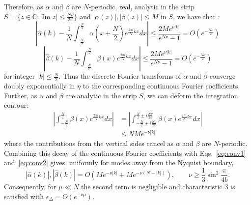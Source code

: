 \documentclass[aps,floatfix,10pt,amssymb,amsfont,amsmath,superscriptaddress,float,nofootinbib,longbibliography,nobalancelastpage,twocolumn]{revtex4-2}
\begin{document}
Therefore, as $\alpha$ and $\beta$ are $N$-periodic, real, analytic in the strip $S =\{z \in \mathbb{C}: |\text{Im } z| \leq \frac{N\nu}{2\pi}\}$ and $|\alpha(z)|, |\beta(z)| \leq M$ in $S$, we have that \cite{trefethen2014exponentially}:
\begin{equation}
\label{eq:conv1}
    \left|\hat\alpha(k) - \frac{1}{N}\int_{-\frac{N}{2}}^{\frac{N}{2}}\alpha(x+\frac{N}{2})e^{\frac{2\pi i}{N}kx} dx\right| \leq \frac{2 Me^{\nu |k|}}{e^{N\nu}-1} = O(e^{-\frac{N\nu}{2}})
\end{equation}
\begin{equation}
\label{eq:conv2}
    \left|\hat\beta(k) - \frac{1}{N}\int_{-\frac{N}{2}}^{\frac{N}{2}}\beta(x)e^{\frac{2\pi i}{N}kx} dx\right| \leq  \frac{2 Me^{\nu |k|}}{e^{N\nu}-1} = O(e^{-\frac{N\nu}{2}})
\end{equation}
for integer $|k| \leq \frac{N}{2}$. Thus the discrete Fourier transforms of $\alpha$ and $\beta$ converge doubly exponentially in $\eta$ to the corresponding continuous Fourier coefficients. Further, as $\alpha$ and $\beta$ are analytic in the strip $S$, we can deform the integration contour:
\begin{align}
    \left|\int_{-\frac{N}{2}}^{\frac{N}{2}}\beta(x)e^{\frac{2\pi i}{N}kx} dx\right| &=\left| \int_{-\frac{N}{2}\pm i\frac{N\nu}{2\pi}}^{\frac{N}{2}\pm i\frac{N\nu}{2\pi}}\beta(x)e^{\frac{2\pi i}{N}kx} dx\right|\\
    &\leq NMe^{-\nu|k|}
    \label{eq:tails}
\end{align}
where the contributions from the vertical sides cancel as $\alpha$ and $\beta$ are $N$-periodic. Combining this decay of the continuous Fourier coefficients with Eqs.~\eqref{eq:conv1} and~\eqref{eq:conv2} gives, uniformly for modes away from the Nyquist boundary,
\begin{equation}
\label{eq:exactdecay}
    |\hat \alpha(k)|, |\hat \beta(k)| = O\!\left(M e^{-\nu|k|}
    +M e^{-\nu(N-|k|)}\right),
    \qquad \nu\geq\frac13\sin^2\frac{\pi}{4b}.
\end{equation}
Consequently, for $\mu\ll N$ the second term is negligible and characteristic 3 is satisfied with $\epsilon_{\Delta}=O(e^{-\nu\mu})$.
\end{document}
